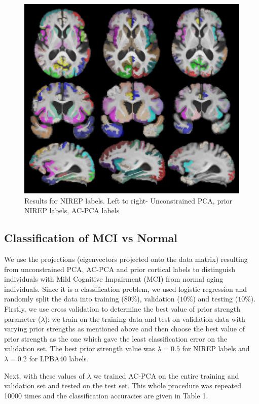 \documentclass{llncs}
\begin{document}
{\begin{figure}
\begin{center}
\includegraphics[width=0.8\linewidth]{nirep.pdf} 
\end{center}
\vspace{-0.2in}
\caption{Results for NIREP labels. Left to right- Unconstrained PCA, prior NIREP labels, AC-PCA labels}
\label{fig:priornirep}
\end{figure}



\subsection{Classification of MCI vs Normal}
We use the projections (eigenvectors projected onto the data matrix) resulting from unconstrained PCA, AC-PCA and prior cortical labels to distinguish individuals with Mild Cognitive Impairment (MCI) from normal aging individuals. 
Since it is a classification problem, we used logistic regression and randomly split the data into training ($80\%$), validation ($10\%$) and testing ($10\%$). Firstly, we use cross validation to determine the best value of prior strength parameter ($\lambda$); we train on the training data and test on validation data with varying prior strengths as mentioned above and then choose the best value of prior strength as the one which gave the least classification error on the validation set.  The best prior strength value was $\lambda =0.5$ for NIREP labels and $\lambda=0.2$ for LPBA40 labels. 

Next, with these values of $\lambda$ we trained AC-PCA on the entire training and validation set and tested on the test set. This whole procedure was repeated 10000 times and the classification accuracies are given in Table 1.

}
\end{document}

